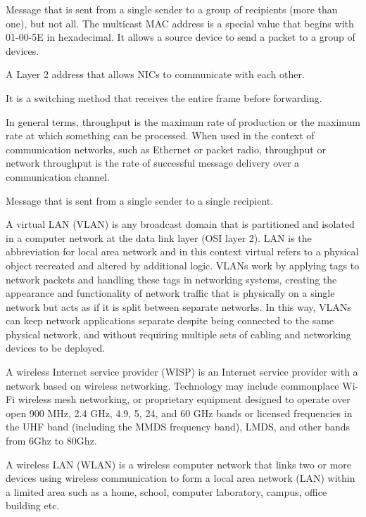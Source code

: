 \label{term_multicast}

Message that is sent from a single sender to a group of recipients (more than one), but not all. The multicast MAC address is a special value that begins with 01-00-5E in hexadecimal. It allows a source device to send a packet to a group of devices.

\label{term_physical_address}

A Layer 2 address that allows NICs to communicate with each other.

\label{term_saf_switching}

It is a switching method that receives the entire frame before forwarding.

\label{term_throughtput}

In general terms, throughput is the maximum rate of production or the maximum rate at which something can be processed. When used in the context of communication networks, such as Ethernet or packet radio, throughput or network throughput is the rate of successful message delivery over a communication channel.

\label{term_unicast}

Message that is sent from a single sender to a single recipient.

\label{term_vlan}

A virtual LAN (VLAN) is any broadcast domain that is partitioned and isolated in a computer network at the data link layer (OSI layer 2). LAN is the abbreviation for local area network and in this context virtual refers to a physical object recreated and altered by additional logic. VLANs work by applying tags to network packets and handling these tags in networking systems, creating the appearance and functionality of network traffic that is physically on a single network but acts as if it is split between separate networks. In this way, VLANs can keep network applications separate despite being connected to the same physical network, and without requiring multiple sets of cabling and networking devices to be deployed.

\label{term_wisp}

A wireless Internet service provider (WISP) is an Internet service provider with a network based on wireless networking. Technology may include commonplace Wi-Fi wireless mesh networking, or proprietary equipment designed to operate over open 900 MHz, 2.4 GHz, 4.9, 5, 24, and 60 GHz bands or licensed frequencies in the UHF band (including the MMDS frequency band), LMDS, and other bands from 6Ghz to 80Ghz.

\label{term_wlan}

A wireless LAN (WLAN) is a wireless computer network that links two or more devices using wireless communication to form a local area network (LAN) within a limited area such as a home, school, computer laboratory, campus, office building etc.

